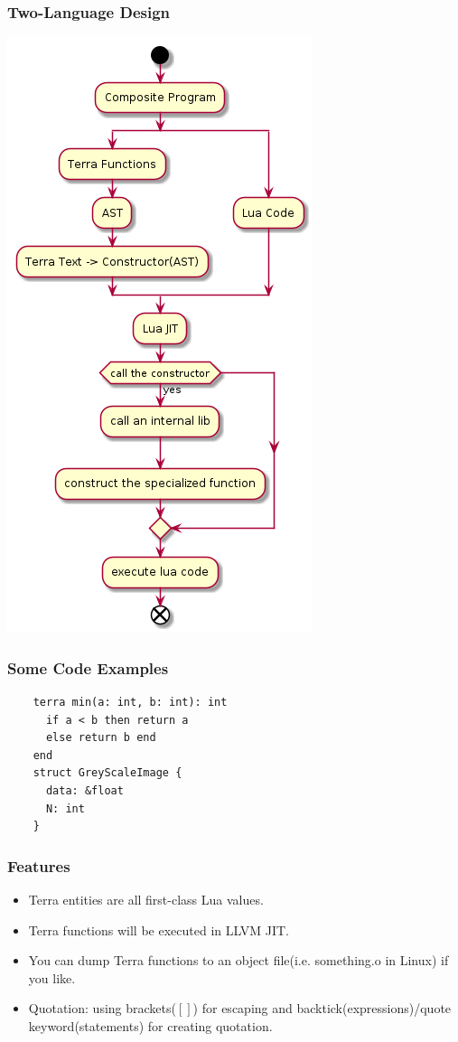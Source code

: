 \documentclass{beamer}
\begin{document}
\begin{frame}
	\frametitle{Two-Language Design}
  \begin{center}
    \includegraphics[scale=0.3]{terra.png}
  \end{center}
\end{frame}

\begin{frame}[fragile]
	\frametitle{Some Code Examples}
  \begin{lstlisting}
    terra min(a: int, b: int): int
      if a < b then return a
      else return b end
    end
    struct GreyScaleImage {
      data: &float
      N: int
    }
  \end{lstlisting}
\end{frame}

\begin{frame}
	\frametitle{Features}
  \begin{itemize}
  \item Terra entities are all first-class Lua values.\pause
  \item Terra functions will be executed in LLVM JIT.\pause
  \item You can dump Terra functions to an object file(i.e. something.o in Linux) if you like.\pause
  \item Quotation: using brackets($[]$) for escaping and backtick(expressions)/quote keyword(statements) for creating quotation.
  \end{itemize}
\end{frame}
\end{document}
